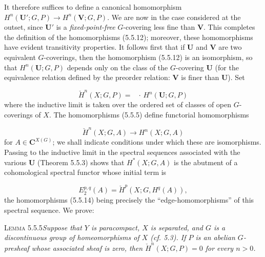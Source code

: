 \clearpage
{}

\noindent It therefore suffices to define a canonical homomorphism
$H^n({\mathbf U}';G,P)\to H^n({\mathbf V};G,P)$. We are now in the case
considered at the outset, since ${\mathbf U}'$ is a \emph{fixed-point-free}
$G$-covering less fine than ${\mathbf V}$. This completes the definition of
the homomorphisms (5.5.12); moreover, these homomorphisms have evident
transitivity properties. It follows first that if ${\mathbf U}$ and
${\mathbf V}$ are two equivalent $G$-coverings, then the homomorphism (5.5.12)
is an isomorphism, so that $H^n({\mathbf U};G,P)$ depends only on the class of
the $G$-covering ${\mathbf U}$ (for the equivalence relation defined by the
preorder relation: ${\mathbf V}$ is finer than ${\mathbf U}$). Set

\[
\tag{5.5.13}
\check H^n(X;G,P)=\mathop{\underset{\to}{\lim}}\,\cdot\,H^n({\mathbf U};G,P)
\]
where the inductive limit is taken over the ordered set of classes of
open $G$-coverings of $X$. The homomorphisms (5.5.5) define functorial
homomorphisms

\[
\tag{5.5.14}
\check H^n(X;G,A)\to H^n(X;G,A)
\]
for $A\in {\mathbf C}^{X(G)}$; we shall indicate conditions under which these
are isomorphisms. Passing to the inductive limit in the spectral sequences
associated with the various ${\mathbf U}$ (Theorem 5.5.3) shows that
$H^*(X;G,A)$ is the abutment of a cohomological spectral functor whose initial
term is

\[
\tag{5.5.15}
E_2^{p,q}(A)=\check H^p(X;G,H^q(A)),
\]
the homomorphisms (5.5.14) being precisely the
``edge-homomorphisms'' of this spectral sequence. We prove:

\textsc{Lemma 5.5.5}\quad \textit{Suppose that $Y$ is paracompact,
$X$ is separated, and $G$ is a discontinuous group of homeomorphisms of $X$
\textup{(}\textit{cf.}\textup{ 5.3)}. If $P$ is an abelian $G$-presheaf whose associated sheaf is
zero, then $\check H^n(X;G,P)=0$ for every $n>0$.}

